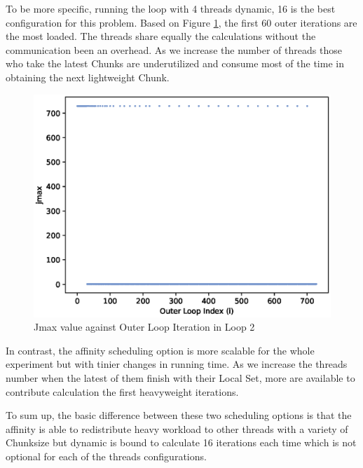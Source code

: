 \documentclass[12pt,a4paper]{article}
\begin{document}
To be more specific, running the loop with 4 threads dynamic, 16 is the best configuration for this problem. Based on Figure \ref{jmax}, the first 60 outer iterations are the most loaded. The threads share equally the calculations without the communication been an overhead. As we increase the number of threads those who take the latest Chunks are underutilized and consume most of the time in obtaining the next lightweight Chunk.

\begin{figure}[ht]
    \centering
    \includegraphics[scale=0.6]{../graphs/jmax.eps}
    \caption{Jmax value against Outer Loop Iteration in Loop 2}
    \label{jmax}
\end{figure}

In contrast, the affinity scheduling option is more scalable for the whole experiment but with tinier changes in running time. As we increase the threads number when the latest of them finish with their Local Set, more are available to contribute calculation the first heavyweight iterations.

To sum up, the basic difference between these two scheduling options is that the affinity is able to redistribute heavy workload to other threads with a variety of Chunksize but dynamic is bound to calculate 16 iterations each time which is not optional for each of the threads configurations.
\end{document}
